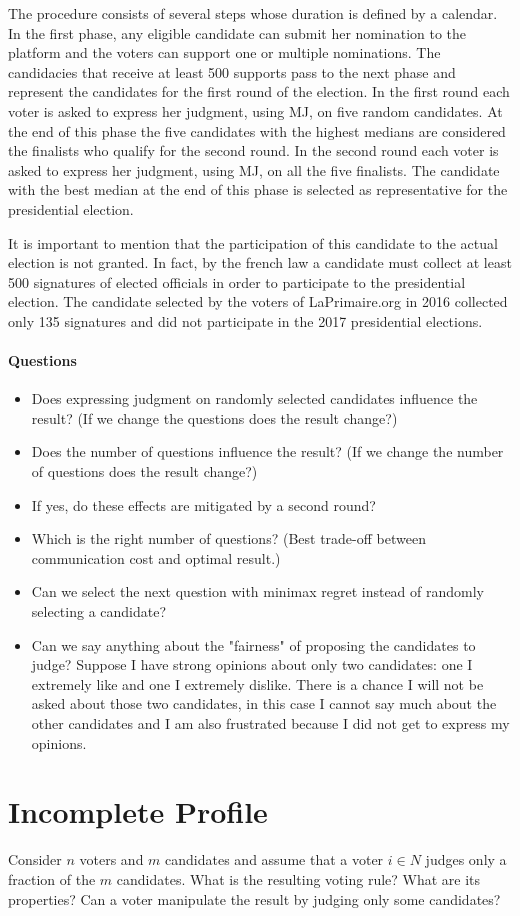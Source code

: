 The procedure consists of several steps whose duration is defined by a calendar. In the first phase, any eligible candidate can submit her nomination to the platform and the voters can support one or multiple nominations. The candidacies that receive at least 500 supports pass to the next phase and represent the candidates for the first round of the election. In the first round each voter is asked to express her judgment, using \ac{MJ}, on five random candidates. At the end of this phase the five candidates with the highest medians are considered the finalists who qualify for the second round. In the second round each voter is asked to express her judgment, using \ac{MJ}, on all the five finalists. The candidate with the best median at the end of this phase is selected as representative for the presidential election.

It is important to mention that the participation of this candidate to the actual election is not granted. In fact, by the french law a candidate must collect at least 500 signatures of elected officials in order to participate to the presidential election. The candidate selected by the voters of LaPrimaire.org in 2016 collected only 135 signatures and did not participate in the 2017 presidential elections.  

\paragraph{Questions}
\begin{itemize}
	\item Does expressing judgment on randomly selected candidates influence the result? (If we change the questions does the result change?)
	\item Does the number of questions influence the result? (If we change the number of questions does the result change?)
	\item If yes, do these effects are mitigated by a second round?
	\item Which is the right number of questions? (Best trade-off between communication cost and optimal result.)
	\item Can we select the next question with minimax regret instead of randomly selecting a candidate?
	\item Can we say anything about the "fairness" of proposing the candidates to judge? Suppose I have strong opinions about only two candidates: one I extremely like and one I extremely dislike. There is a chance I will not be asked about those two candidates, in this case I cannot say much about the other candidates and I am also frustrated because I did not get to express my opinions.
\end{itemize}


\section{Incomplete Profile}
Consider $n$ voters and $m$ candidates and assume that a voter $i \in N$ judges only a fraction of the $m$ candidates. What is the resulting voting rule? What are its properties? Can a voter manipulate the result by judging only some candidates?
